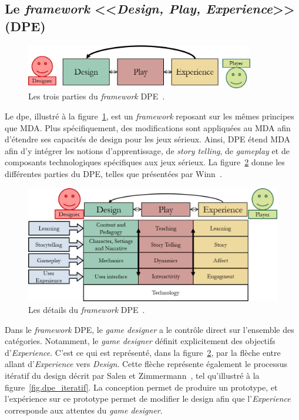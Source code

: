 \subsection{Le \emph{framework} <<\emph{Design, Play, Experience}>> (DPE)}

\begin{figure}[H]
    \centering
    \includegraphics[width=10cm]{10_img/chap3/dpe.png} 
    \caption{Les trois parties du \emph{framework} DPE~\cite{Winn2011}.}
    \label{fig.dpe}
\end{figure}

Le \gls{dpe}, illustr\'e \`a la figure~\ref{fig.dpe}, est un \emph{framework} reposant sur les mêmes principes que MDA. 
Plus sp\'ecifiquement, des modifications sont appliquées au MDA afin d'étendre ses capacités de design pour les jeux sérieux. 
Ainsi, DPE étend MDA afin d'y intégrer les notions d'apprentissage, de \emph{story telling}, de \emph{gameplay} et de composants technologiques spécifiques aux jeux sérieux. 
La figure~\ref{fig.dpe_extended} donne les différentes parties du DPE, telles que présentées par Winn~\cite{Winn2011}.


\begin{figure}[H]
    \centering
    \includegraphics[width=14cm]{10_img/chap3/dpe_extended.png} 
    \caption{Les d\'etails du \emph{framework} DPE~\cite{Winn2011}.}
    \label{fig.dpe_extended}
\end{figure}


Dans le \emph{framework} DPE, le \emph{game designer} a le contrôle direct sur l'ensemble des catégories. 
Notamment, le \emph{game designer} définit explicitement des objectifs d'\emph{Experience}. 
C'est ce qui est représenté, dans la figure~\ref{fig.dpe_extended}, par la flèche entre allant d'\emph{Experience} vers \emph{Design}. 
Cette flèche représente également le processus itératif du design décrit par Salen et Zimmermann~\cite{Salen2013}, tel qu'illustr\'e \`a la figure~\ref{fig.dpe_iteratif}. 
La conception permet de produire un prototype, et l'expérience sur ce prototype permet de modifier le design afin que l'\emph{Experience} corresponde aux attentes du \emph{game designer}.


